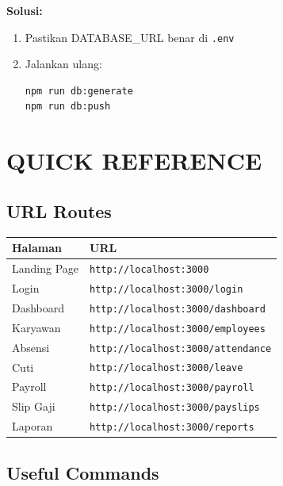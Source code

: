 \documentclass[12pt,a4paper]{article}
\begin{document}
\textbf{Solusi:}
\begin{enumerate}
    \item Pastikan DATABASE\_URL benar di \texttt{.env}
    \item Jalankan ulang:
\begin{lstlisting}[language=bash]
npm run db:generate
npm run db:push
\end{lstlisting}
\end{enumerate}

\newpage
\section{QUICK REFERENCE}

\subsection{URL Routes}

\begin{center}
\begin{tabular}{|l|l|}
    \hline
    \textbf{Halaman} & \textbf{URL} \\
    \hline
    Landing Page & \texttt{http://localhost:3000} \\
    \hline
    Login & \texttt{http://localhost:3000/login} \\
    \hline
    Dashboard & \texttt{http://localhost:3000/dashboard} \\
    \hline
    Karyawan & \texttt{http://localhost:3000/employees} \\
    \hline
    Absensi & \texttt{http://localhost:3000/attendance} \\
    \hline
    Cuti & \texttt{http://localhost:3000/leave} \\
    \hline
    Payroll & \texttt{http://localhost:3000/payroll} \\
    \hline
    Slip Gaji & \texttt{http://localhost:3000/payslips} \\
    \hline
    Laporan & \texttt{http://localhost:3000/reports} \\
    \hline
\end{tabular}
\end{center}

\subsection{Useful Commands}
\end{document}
